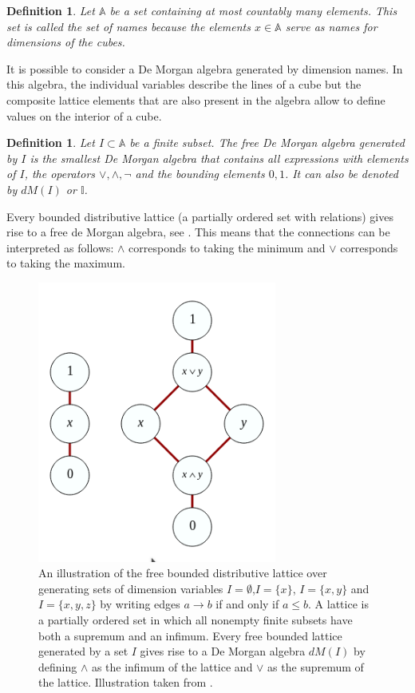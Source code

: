 \documentclass[12pt,a4paper,twoside,xetex]{book} %
\newcommand{\keyword}[1]{\emph{#1}\index{#1}}
\newtheorem{definition}[theorem]{Definition}
\begin{document}
\begin{definition}
Let $\mathbb{A}$ be a set containing at most countably many elements. This set 
is called the \keyword{set of names} because the elements $x \in \mathbb{A}$ 
serve as names for dimensions of the cubes. 
\end{definition}

It is possible to consider a De Morgan algebra generated by dimension 
names. In this algebra, the individual variables describe the lines of a cube 
but the composite lattice elements that are also present in the algebra allow 
to define values on the interior of a cube.


\begin{definition}\label{freedm}
Let $I \subset \mathbb{A}$ be a finite subset. The \keyword{free De Morgan 
algebra} generated by $I$ is the smallest De Morgan algebra that contains all 
expressions with elements of $I$, the operators $\vee, \wedge, \neg$ and  the 
bounding elements $0, 1$. It can also be denoted by $dM(I)$ or $\mathbb{I}$.
\end{definition}

Every bounded distributive lattice (a partially ordered set with relations) gives rise to a free de Morgan algebra, see . This means that the connections can be interpreted as follows: $\wedge$ corresponds to taking the minimum and $\vee$ corresponds to taking the maximum.

\begin{figure}\label{latticeex}
\centering
\includegraphics[width=0.7\textwidth,height=0.7\textheight,keepaspectratio=true]{figures/lattice.png}
\caption{An illustration of the free bounded distributive lattice over generating sets of dimension variables $I=\emptyset$,$I=\{x\}$, $I=\{x,y\}$ and $I=\{x,y,z\}$ by writing edges $a \rightarrow b$ if and only if $a \leq b$. A lattice is a partially ordered set in which all nonempty finite subsets have both a supremum and an infimum. Every free bounded lattice generated by a set $I$ gives rise to a De Morgan algebra $dM(I)$ by defining $\wedge$ as the infimum of the lattice and $\vee$ as the supremum of the lattice. Illustration taken from \cite{Eppstein2010}.}
\end{figure}
\end{document}
